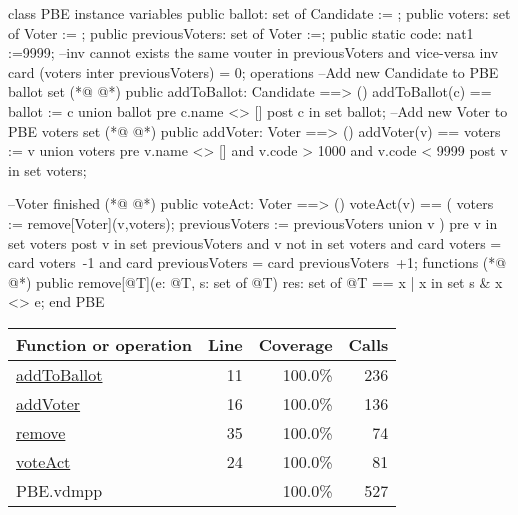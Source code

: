 \begin{vdmpp}
class PBE
instance variables
 public ballot: set of Candidate := {};
 public voters: set of Voter := {};
 public previousVoters:  set of Voter :={};
 public static code: nat1 :=9999;
 --inv cannot exists the same vouter in previousVoters and vice-versa
 inv card (voters inter previousVoters) = 0;
operations
--Add new Candidate to PBE ballot set
(*@
\label{addToBallot:11}
@*)
 public addToBallot: Candidate ==> ()
 addToBallot(c) == ballot := {c} union ballot
 pre c.name <> []
 post c in set ballot;
--Add new Voter to PBE voters set
(*@
\label{addVoter:16}
@*)
  public addVoter: Voter ==> ()
 addVoter(v) == voters := {v} union voters
 pre v.name <> []
  and v.code > 1000 
  and v.code < 9999
 post v in set voters;
 
--Voter finished
(*@
\label{voteAct:24}
@*)
 public voteAct: Voter ==> ()
 voteAct(v) == (
         voters := remove[Voter](v,voters);
         previousVoters := previousVoters union {v}
        )
 pre v in set voters
 post v in set previousVoters
    and v not in set voters
    and card voters = card voters~-1
    and card previousVoters = card previousVoters~+1;
functions
(*@
\label{remove:35}
@*)
    public remove[@T](e: @T, s: set of @T) res: set of @T ==
     {x | x in set s & x <> e};
end PBE
\end{vdmpp}
\bigskip
\begin{longtable}{|l|r|r|r|}
\hline
Function or operation & Line & Coverage & Calls \\
\hline
\hline
\hyperref[addToBallot:11]{addToBallot} & 11&100.0\% & 236 \\
\hline
\hyperref[addVoter:16]{addVoter} & 16&100.0\% & 136 \\
\hline
\hyperref[remove:35]{remove} & 35&100.0\% & 74 \\
\hline
\hyperref[voteAct:24]{voteAct} & 24&100.0\% & 81 \\
\hline
\hline
PBE.vdmpp & & 100.0\% & 527 \\
\hline
\end{longtable}

